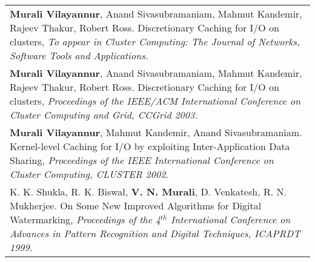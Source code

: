 \documentclass{article}
\begin{document}
\begin{center}
\begin{tabularx}{6.2in}{X}
	{\bf Murali Vilayannur}, Anand Sivasubramaniam, Mahmut Kandemir, Rajeev Thakur, Robert Ross.
	Discretionary Caching for I/O on clusters, \emph{To appear in Cluster Computing: The Journal of
	Networks, Software Tools and Applications.} \\
	{\bf Murali Vilayannur}, Anand Sivasubramaniam, Mahmut Kandemir, Rajeev Thakur, Robert Ross.
	Discretionary Caching for I/O on clusters, \emph{Proceedings of the IEEE/ACM
	International Conference on Cluster Computing and Grid, CCGrid 2003.} \\
   {\bf Murali Vilayannur}, Mahmut Kandemir, Anand Sivasubramaniam. 
   Kernel-level Caching for I/O by exploiting Inter-Application Data Sharing, \emph{Proceedings of
   the IEEE International Conference on Cluster Computing, CLUSTER 2002.} \\
   K. K. Shukla, R. K. Biswal, {\bf V. N. Murali}, D. Venkatesh, R. N. Mukherjee. 
	On Some New Improved Algorithms for Digital Watermarking, \emph{Proceedings of the 4$^{th}$
	International Conference on Advances in Pattern Recognition and Digital Techniques, ICAPRDT 1999.} \\
	\end{tabularx}
  \end{center}




\end{document}
